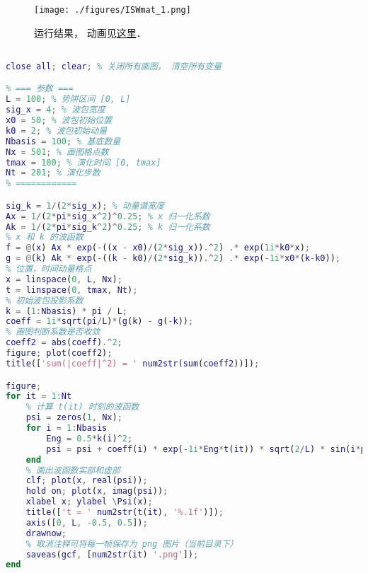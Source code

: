 
\begin{issues}
\issueDraft
\end{issues}


\begin{figure}[ht]
\centering
\texttt{[image: ./figures/ISWmat\_1.png]}
\caption{运行结果， 动画见\href{https://wuli.wiki/apps/wvISW.html}{这里}．} \label{ISWmat_fig1}
\end{figure}

\begin{lstlisting}[language=matlab, caption=WpkISW.m]
% 无限深势阱中的波包

close all; clear; % 关闭所有画图， 清空所有变量

% === 参数 ===
L = 100; % 势阱区间 [0, L]
sig_x = 4; % 波包宽度
x0 = 50; % 波包初始位置
k0 = 2; % 波包初始动量
Nbasis = 100; % 基底数量
Nx = 501; % 画图格点数
tmax = 100; % 演化时间 [0, tmax]
Nt = 201; % 演化步数
% ============

sig_k = 1/(2*sig_x); % 动量谱宽度
Ax = 1/(2*pi*sig_x^2)^0.25; % x 归一化系数
Ak = 1/(2*pi*sig_k^2)^0.25; % k 归一化系数
% x 和 k 的波函数
f = @(x) Ax * exp(-((x - x0)/(2*sig_x)).^2) .* exp(1i*k0*x);
g = @(k) Ak * exp(-((k - k0)/(2*sig_k)).^2) .* exp(-1i*x0*(k-k0));
% 位置，时间动量格点
x = linspace(0, L, Nx);
t = linspace(0, tmax, Nt);
% 初始波包投影系数
k = (1:Nbasis) * pi / L;
coeff = 1i*sqrt(pi/L)*(g(k) - g(-k));
% 画图判断系数是否收敛
coeff2 = abs(coeff).^2;
figure; plot(coeff2);
title(['sum(|coeff|^2) = ' num2str(sum(coeff2))]);

figure;
for it = 1:Nt
    % 计算 t(it) 时刻的波函数
    psi = zeros(1, Nx);
    for i = 1:Nbasis
        Eng = 0.5*k(i)^2;
        psi = psi + coeff(i) * exp(-1i*Eng*t(it)) * sqrt(2/L) * sin(i*pi*x/L);
    end
    % 画出波函数实部和虚部
    clf; plot(x, real(psi));
    hold on; plot(x, imag(psi));
    xlabel x; ylabel \Psi(x);
    title(['t = ' num2str(t(it), '%.1f')]);
    axis([0, L, -0.5, 0.5]);
    drawnow;
    % 取消注释可将每一帧保存为 png 图片（当前目录下）
    saveas(gcf, [num2str(it) '.png']);
end
\end{lstlisting}
